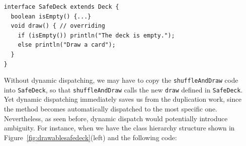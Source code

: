\vspace{3pt}\begin{lstlisting}
interface SafeDeck extends Deck {
  boolean isEmpty() {...}
  void draw() { // overriding
    if (isEmpty()) println("The deck is empty.");
    else println("Draw a card");
  }
}
\end{lstlisting}\vspace{3pt}
Without dynamic dispatching, we may have to copy the \lstinline|shuffleAndDraw| code into \lstinline|SafeDeck|, so that \lstinline|shuffleAndDraw| calls the new \lstinline|draw| defined in \lstinline|SafeDeck|. Yet dynamic dispatching immediately saves us from the duplication work,
since the method becomes automatically dispatched to the most specific one. Nevertheless, as seen before, dynamic dispatch would potentially introduce ambiguity.
For instance, when we have the class hierarchy structure shown in Figure~\ref{fig:drawablesafedeck}(left) and the following code:



